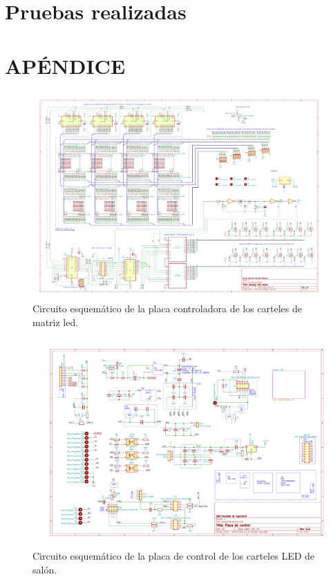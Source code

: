 \section{Pruebas realizadas}

\pagebreak

\section{APÉNDICE}


\begin{figure}[H]
	\centering
	\includegraphics[width=1.66\textwidth, angle=90]{./Figures/output.driverled.pdf}
	\caption{Circuito esquemático de la placa controladora de los carteles de matriz led.}
	\label{fig:schDriverled}
\end{figure}

\begin{figure}[H]
	\centering
	\includegraphics[width=1.66\textwidth, angle=90]{./Figures/output.placaControl.pdf}
	\caption{Circuito esquemático de la placa de control de los carteles LED de salón.}
	\label{fig:schController}
\end{figure}